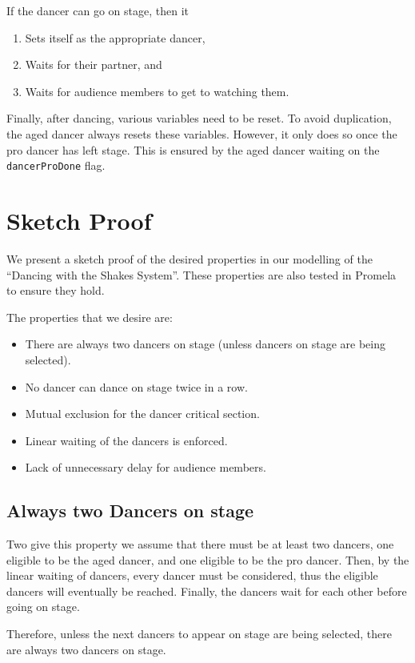 \documentclass[12pt,a4paper]{scrartcl}
\begin{document}
If the dancer can go on stage, then it
\begin{enumerate}
    \item Sets itself as the appropriate dancer,
    \item Waits for their partner, and 
    \item Waits for audience members to get to watching them.
\end{enumerate}

Finally, after dancing, various variables need to be reset.
To avoid duplication, the aged dancer always resets these variables.
However, it only does so once the pro dancer has left stage.
This is ensured by the aged dancer waiting on the \texttt{dancerProDone} flag.

\section{Sketch Proof}
We present a sketch proof of the desired properties in our modelling of the ``Dancing with the Shakes System''.
These properties are also tested in Promela to ensure they hold.

The properties that we desire are:
\begin{itemize}
    \item There are always two dancers on stage (unless dancers on stage are being selected).
    \item No dancer can dance on stage twice in a row.
    \item Mutual exclusion for the dancer critical section.
    \item Linear waiting of the dancers is enforced.
    \item Lack of unnecessary delay for audience members.
\end{itemize}

\subsection{Always two Dancers on stage}
Two give this property we assume that there must be at least two dancers, one eligible to be the aged dancer, and one eligible to be the pro dancer.
Then, by the linear waiting of dancers, every dancer must be considered, thus the eligible dancers will eventually be reached.
Finally, the dancers wait for each other before going on stage.

Therefore, unless the next dancers to appear on stage are being selected, there are always two dancers on stage.
\end{document}

